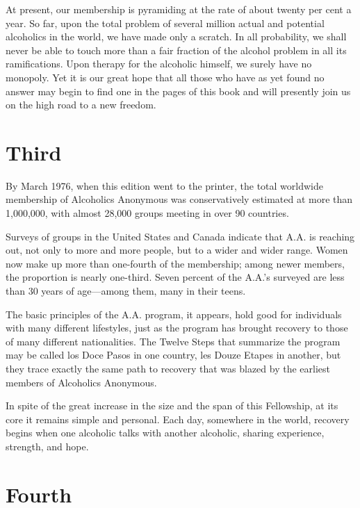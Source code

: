 At present, our membership is pyramiding at the rate of about twenty per cent a year.
So far, upon the
total problem of several million actual and potential alcoholics in the world, we have made only a scratch.
In all probability, we shall never be able to touch more than a fair fraction of the alcohol problem in all its ramiﬁcations.
Upon therapy for the alcoholic himself, we surely have no monopoly. 
Yet it is our great hope that all those who have as yet found no answer may begin to find one in the pages of this book and will presently join us on the high road to a new freedom.



\section{Third}

By March 1976, when this edition went to the printer, the total worldwide membership of Alcoholics Anonymous was conservatively estimated at more than 1,000,000, with almost 28,000 groups meeting in over 90 countries.

Surveys of groups in the United States and Canada indicate that A.A. is reaching out, not only to more and more people, but to a wider and wider range.
Women now make up more than one-fourth of the membership; 
among newer members, the proportion is nearly one-third. 
Seven percent of the A.A.’s surveyed are less than 30 years of age—among them, many in their teens.

The basic principles of the A.A. program, it appears, hold  good  for  individuals  with  many  different lifestyles, just as the program has brought recovery to those of many different nationalities. 
The Twelve Steps that summarize the program may be called los Doce Pasos in one country, les Douze Etapes in another, but they trace exactly the same path to recovery that was blazed by the earliest members of Alcoholics Anonymous.

In spite of the great increase in the size and the span of this Fellowship, at its core it remains simple and personal. Each day, somewhere in the world, recovery begins when one alcoholic talks with another alcoholic, sharing experience, strength, and hope.



\section{Fourth}

